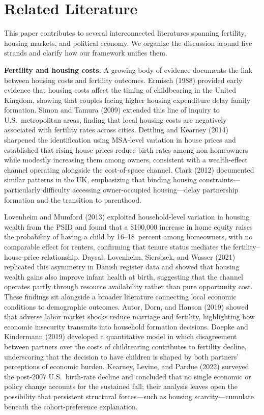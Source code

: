 \section{Related Literature}

This paper contributes to several interconnected literatures spanning fertility, housing markets, and political economy. We organize the discussion around five strands and clarify how our framework unifies them.

\medskip
\noindent\textbf{Fertility and housing costs.}
A growing body of evidence documents the link between housing costs and fertility outcomes. Ermisch (1988) provided early evidence that housing costs affect the timing of childbearing in the United Kingdom, showing that couples facing higher housing expenditure delay family formation. Simon and Tamura (2009) extended this line of inquiry to U.S.\ metropolitan areas, finding that local housing costs are negatively associated with fertility rates across cities. Dettling and Kearney (2014) sharpened the identification using MSA-level variation in house prices and established that rising house prices reduce birth rates among non-homeowners while modestly increasing them among owners, consistent with a wealth-effect channel operating alongside the cost-of-space channel. Clark (2012) documented similar patterns in the UK, emphasizing that binding housing constraints---particularly difficulty accessing owner-occupied housing---delay partnership formation and the transition to parenthood.

Lovenheim and Mumford (2013) exploited household-level variation in housing wealth from the PSID and found that a \$100,000 increase in home equity raises the probability of having a child by 16--18~percent among homeowners, with no comparable effect for renters, confirming that tenure status mediates the fertility--house-price relationship. Daysal, Lovenheim, Siersbæk, and Wasser (2021) replicated this asymmetry in Danish register data and showed that housing wealth gains also improve infant health at birth, suggesting that the channel operates partly through resource availability rather than pure opportunity cost. These findings sit alongside a broader literature connecting local economic conditions to demographic outcomes. Autor, Dorn, and Hanson (2019) showed that adverse labor market shocks reduce marriage and fertility, highlighting how economic insecurity transmits into household formation decisions. Doepke and Kindermann (2019) developed a quantitative model in which disagreement between partners over the costs of childrearing contributes to fertility decline, underscoring that the decision to have children is shaped by both partners' perceptions of economic burden. Kearney, Levine, and Pardue (2022) surveyed the post-2007 U.S.\ birth-rate decline and concluded that no single economic or policy change accounts for the sustained fall; their analysis leaves open the possibility that persistent structural forces---such as housing scarcity---cumulate beneath the cohort-preference explanation.


